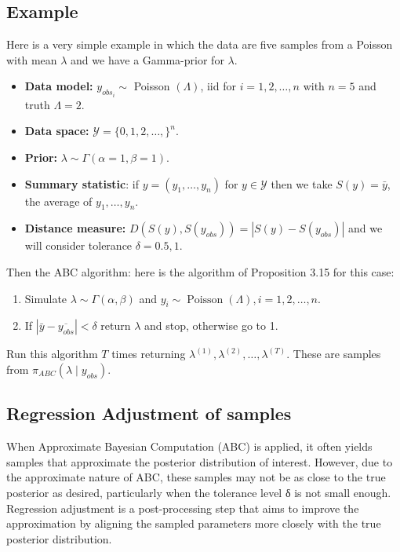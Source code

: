 \documentclass{article}
\begin{document}
\subsection{Example}
Here is a very simple example in which the data are five samples from a Poisson with mean $\lambda$ and we have a Gamma-prior for $\lambda$.
\begin{itemize}
    \item \textbf{Data model:} $y_{obs_i} \sim$ Poisson $(\Lambda)$, iid for $i=1,2, \ldots, n$ with $n=5$ and truth $\Lambda=2$.
    \item \textbf{Data space: }$\mathcal{Y}=\{0,1,2, \ldots,\}^n$.
    \item \textbf{Prior: }$\lambda \sim \Gamma(\alpha=1, \beta=1)$.
    \item \textbf{Summary statistic}: if $y=\left(y_1, \ldots, y_n\right)$ for $y \in \mathcal{Y}$ then we take $S(y)=\bar{y}$, the average of $y_1, \ldots, y_n$.
    \item \textbf{Distance measure:} $D\left(S(y), S\left(y_{o b s}\right)\right)=\left|S(y)-S\left(y_{o b s}\right)\right|$ and we will consider tolerance $\delta=0.5,1$.

\end{itemize}

Then the ABC algorithm: here is the algorithm of Proposition 3.15 for this case:
\begin{enumerate}
    \item Simulate $\lambda \sim \Gamma(\alpha, \beta)$ and $y_i \sim \operatorname{Poisson}(\Lambda), i=1,2, \ldots, n$.
    \item If $\left|\bar{y}-\overline{y_{o b s}}\right|<\delta$ return $\lambda$ and stop, otherwise go to 1.
\end{enumerate}

Run this algorithm $T$ times returning $\lambda^{(1)}, \lambda^{(2)}, \ldots, \lambda^{(T)}$. These are samples from $\pi_{A B C}\left(\lambda \mid y_{o b s}\right)$.

\subsection{Regression Adjustment of samples}
When Approximate Bayesian Computation (ABC) is applied, it often yields samples that approximate the posterior distribution of interest. However, due to the approximate nature of ABC, these samples may not be as close to the true posterior as desired, particularly when the tolerance level δ is not small enough. Regression adjustment is a post-processing step that aims to improve the approximation by aligning the sampled parameters more closely with the true posterior distribution.
\end{document}
